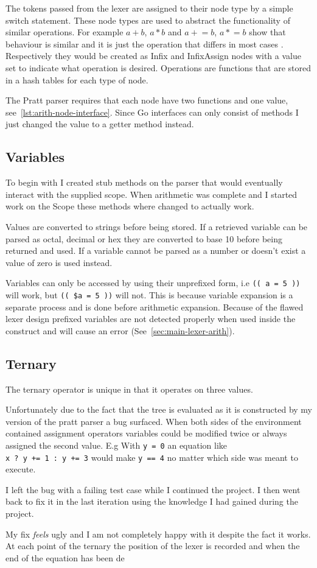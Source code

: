 The tokens passed from the lexer are assigned to their node type by a simple switch statement.
These node types are used to abstract the functionality of similar operations.
For example $a + b$, $a * b$ and $a \mathrel{+}= b$, $a \mathrel{*}= b$ show that behaviour is similar and it is just the operation that differs in most cases .
Respectively they would be created as Infix and InfixAssign nodes with a value set to indicate what operation is desired.
Operations are functions that are stored in a hash tables for each type of node.

The Pratt parser requires that each node have two functions and one value, see~\ref{lst:arith-node-interface}.
Since Go interfaces can only consist of methods I just changed the value to a getter method instead.

\subsection{Variables}
To begin with I created stub methods on the parser that would eventually interact with the supplied scope.
When arithmetic was complete and I started work on the Scope these methods where changed to actually work.

Values are converted to strings before being stored.
If a retrieved variable can be parsed as octal, decimal or hex they are converted to base 10 before being returned and used.
If a variable cannot be parsed as a number or doesn't exist a value of zero is used instead.

Variables can only be accessed by using their unprefixed form, i.e \verb!(( a = 5 ))! will work, but \verb!(( $a = 5 ))! will not.
This is because variable expansion is a separate process and is done before arithmetic expansion.
Because of the flawed lexer design prefixed variables are not detected properly when used inside the construct and will cause an error (See~\ref{sec:main-lexer-arith}).

\subsection{Ternary}
The ternary operator is unique in that it operates on three values.

Unfortunately due to the fact that the tree is evaluated as it is constructed by my version of the pratt parser a bug surfaced.
When both sides of the environment contained assignment operators variables could be modified twice or always assigned the second value.
E.g With \verb!y = 0! an equation like \\ \verb!x ? y += 1 : y += 3! would make \verb!y == 4! no matter which side was meant to execute.

I left the bug with a failing test case while I continued the project.
I then went back to fix it in the last iteration using the knowledge I had gained during the project.

My fix \textit{feels} ugly and I am not completely happy with it despite the fact it works.
At each point of the ternary the position of the lexer is recorded and when the end of the equation has been de